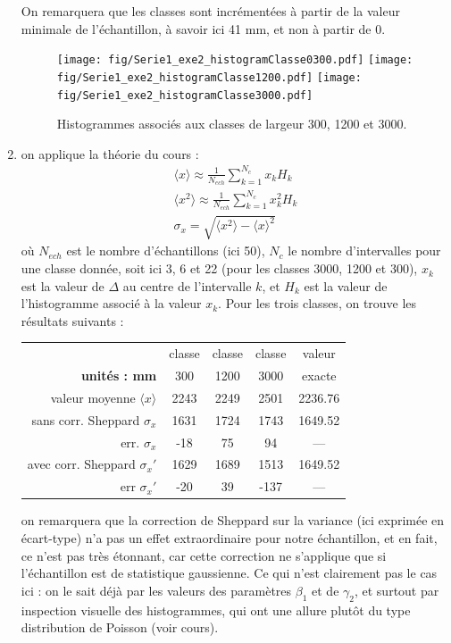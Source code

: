 \begin{enumerate}
\newpage
On remarquera que les classes sont incrémentées à partir de la valeur minimale de l'échantillon, à savoir ici 41 mm, et non à partir de 0.
\begin{figure}[htbp] %
   \centering
   \texttt{[image: fig/Serie1\_exe2\_histogramClasse0300.pdf]}
   \texttt{[image: fig/Serie1\_exe2\_histogramClasse1200.pdf]}
   \texttt{[image: fig/Serie1\_exe2\_histogramClasse3000.pdf]}
   \caption{Histogrammes associés aux classes de largeur 300, 1200 et 3000.}
   \label{fig:02}
\end{figure}
\item on applique la théorie du cours :
\begin{gather}
\langle x \rangle \approx \frac{1}{N_{ech}}\sum\limits_{k=1}^{N_c} x_k H_k\\
\langle x^2 \rangle \approx \frac{1}{N_{ech}}\sum\limits_{k=1}^{N_c} x_k^2 H_k\\
\sigma_x=\sqrt{\langle x^2 \rangle-\langle x \rangle^2}
\end{gather}
où $N_{ech}$ est le nombre d'échantillons (ici 50), $N_c$ le nombre d'intervalles pour une classe donnée, soit ici 3, 6 et 22 (pour les classes 3000, 1200 et 300), $x_k$ est la valeur de $\Delta$ au centre de l'intervalle $k$, et $H_k$ est la valeur de l'histogramme associé à la valeur $x_k$. Pour les trois classes, on trouve les résultats suivants :
\begin{center}
\begin{tabular}{rcccc}
 & classe & classe & classe & valeur\\
\textbf{unités : mm} & 300 & 1200 & 3000 & exacte\\\hline
valeur moyenne $\langle x \rangle$ & 2243 & 2249 & 2501 & 2236.76 \\
sans corr. Sheppard $\sigma_x$ & 1631 & 1724 & 1743 & 1649.52\\
err. $\sigma_x$ & -18 & 75 & 94 & ---\\
avec corr. Sheppard $\sigma_x'$ & 1629 & 1689 & 1513 & 1649.52\\
err $\sigma_x'$ & -20 & 39 & -137 & ---\\
\hline
\end{tabular}
\end{center}
on remarquera que la correction de Sheppard sur la variance (ici exprimée en écart-type) n'a pas un effet extraordinaire pour notre échantillon, et en fait, ce n'est pas très étonnant, car cette correction ne s'applique que si l'échantillon est de statistique gaussienne. Ce qui n'est clairement pas le cas ici : on le sait déjà par les valeurs des paramètres $\beta_1$ et de $\gamma_2$, et surtout par inspection visuelle des histogrammes, qui ont une allure plutôt du type distribution de Poisson (voir cours).

\end{enumerate}
